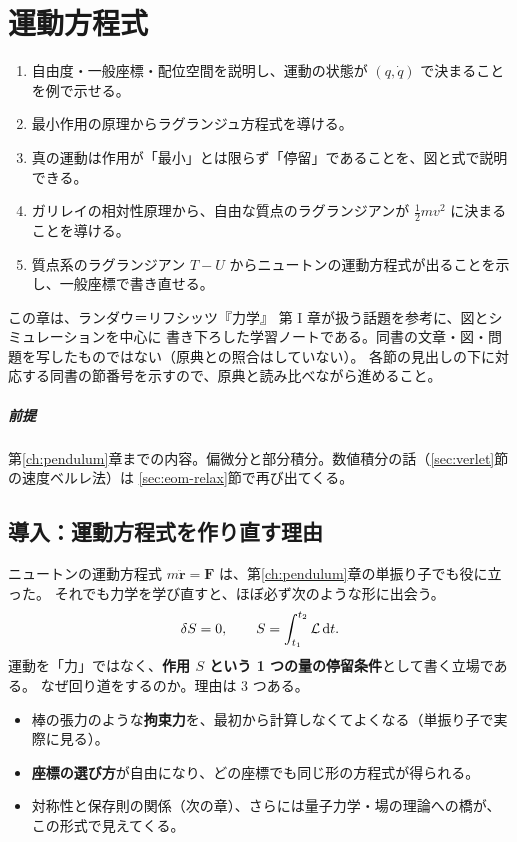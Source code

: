 \chapter{運動方程式}\label{ch:eom}

\begin{objectives}
\begin{enumerate}
  \item 自由度・一般座標・配位空間を説明し、運動の状態が $(q,\dot q)$ で決まることを例で示せる。
  \item 最小作用の原理からラグランジュ方程式を導ける。
  \item 真の運動は作用が「最小」とは限らず「停留」であることを、図と式で説明できる。
  \item ガリレイの相対性原理から、自由な質点のラグランジアンが $\tfrac12mv^2$ に決まることを導ける。
  \item 質点系のラグランジアン $T-U$ からニュートンの運動方程式が出ることを示し、一般座標で書き直せる。
\end{enumerate}
\end{objectives}

\begin{note}
この章は、ランダウ＝リフシッツ『力学』\cite{ll-mech} 第 I 章が扱う話題を参考に、図とシミュレーションを中心に
書き下ろした学習ノートである。同書の文章・図・問題を写したものではない（原典との照合はしていない）。
各節の見出しの下に対応する同書の節番号を示すので、原典と読み比べながら進めること。
\end{note}

\paragraph{前提}
第\ref{ch:pendulum}章までの内容。偏微分と部分積分。数値積分の話（\ref{sec:verlet}節の速度ベルレ法）は
\ref{sec:eom-relax}節で再び出てくる。

\section{導入：運動方程式を作り直す理由}\label{sec:eom-intro}

ニュートンの運動方程式 $m\ddot{\bm r}=\bm F$ は、第\ref{ch:pendulum}章の単振り子でも役に立った。
それでも力学を学び直すと、ほぼ必ず次のような形に出会う。
\begin{equation}
  \delta S=0,\qquad S=\int_{t_1}^{t_2}\mathcal{L}\,\mathrm{d} t.
\end{equation}
運動を「力」ではなく、\textbf{作用 $S$ という 1 つの量の停留条件}として書く立場である。
なぜ回り道をするのか。理由は 3 つある。
\begin{itemize}
  \item 棒の張力のような\textbf{拘束力}を、最初から計算しなくてよくなる（単振り子で実際に見る）。
  \item \textbf{座標の選び方}が自由になり、どの座標でも同じ形の方程式が得られる。
  \item 対称性と保存則の関係（次の章）、さらには量子力学・場の理論への橋が、この形式で見えてくる。
\end{itemize}

